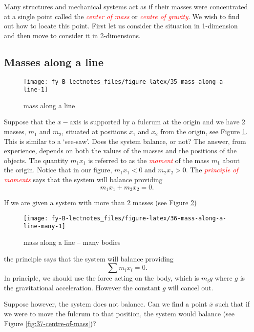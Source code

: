 \documentclass[
  11pt,
  oneside]{book}
\newcommand{\slide}{}
\theoremstyle{definition}
\theoremstyle{definition}
\theoremstyle{definition}
\theoremstyle{definition}
\theoremstyle{remark}
\begin{document}
Many structures and mechanical systems act as if their masses were concentrated at a single point called the \textcolor{red}{\em center of mass} or \textcolor{red}{\em centre of gravity}. We wish to find out how to locate this point. First let us consider the situation in 1-dimension and then move to consider it in 2-dimensions.

\slide

\subsection{Masses along a line}\label{masses-along-a-line}

\begin{figure}

{\centering \texttt{[image: fy-B-lectnotes\_files/figure-latex/35-mass-along-a-line-1]} 

}

\caption{mass along a line}\label{fig:35-mass-along-a-line}
\end{figure}

Suppose that the \(x-\)axis is supported by a fulcrum at the origin and we have 2 masses, \(m_1\) and \(m_2\), situated at positions \(x_1\) and \(x_2\) from the origin, see Figure \ref{fig:35-mass-along-a-line}. This is similar to a `see-saw'. Does the system balance, or not? The answer, from experience, depends on both the values of the masses and the positions of the objects. The quantity \(m_1x_1\) is referred to as the \textcolor{red}{\em moment} of the mass \(m_1\) about the origin. Notice that in our figure, \(m_1x_1<0\) and \(m_2x_2>0\). The \textcolor{red}{\em principle of moments} says that the system will balance providing
\[
m_1x_1 + m_2x_2 = 0.
\]

\slide

If we are given a system with more than 2 masses (see Figure \ref{fig:36-mass-along-a-line-many})

\begin{figure}

{\centering \texttt{[image: fy-B-lectnotes\_files/figure-latex/36-mass-along-a-line-many-1]} 

}

\caption{mass along a line -- many bodies}\label{fig:36-mass-along-a-line-many}
\end{figure}

the principle says that the system will balance providing
\[
\sum m_ix_i = 0.
\]
In principle, we should use the force acting on the body, which is \(m_ig\) where \(g\) is the gravitational acceleration. However the constant \(g\) will cancel out.
\slide
Suppose however, the system does not balance. Can we find a point \(\overline x\) such that if we were to move the fulcrum to that position, the system would balance (see Figure \ref{fig:37-centre-of-mass})?
\end{document}
